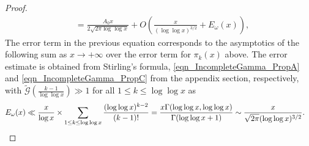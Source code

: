 \documentclass[11pt,reqno,a4letter]{article}
\numberwithin{figure}{section}
\numberwithin{table}{section}
\theoremstyle{plain}
\numberwithin{theorem}{section}
\theoremstyle{definition}
\begin{document}
\begin{proof}
\begin{align*}
     & = \frac{A_0 x}{2\sqrt{2\pi \log\log x}} + 
     O\left(\frac{x}{(\log\log x)^{3/2}} + E_{\omega}(x)\right), 
\end{align*}
The error term in the previous equation corresponds to the asymptotics of the 
following sum as $x \rightarrow +\infty$ over the error term for $\pi_k(x)$ above. 
The error estimate is obtained from Stirling's formula, \eqref{eqn_IncompleteGamma_PropA} and 
\eqref{eqn_IncompleteGamma_PropC} from the appendix section, respectively, with 
$\widetilde{\mathcal{G}}\left(\frac{k-1}{\log\log x}\right) \gg 1$ for all 
$1 \leq k \leq \log\log x$ as
\begin{align*} 
E_{\omega}(x) \ll \frac{x}{\log x} \times \sum_{1 \leq k \leq \log\log x} \frac{(\log\log x)^{k-2}}{(k-1)!} & = 
     \frac{x \Gamma(\log\log x, \log\log x)}{\Gamma(\log\log x + 1)} 
     \sim \frac{x}{\sqrt{2\pi} (\log\log x)^{3/2}}. 
     \qedhere 
\end{align*}
\end{proof}
\end{document}
